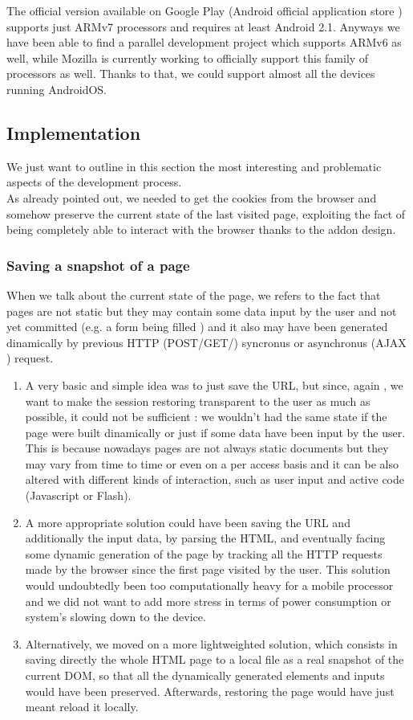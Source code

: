 \documentclass[11pt,a4paper]{article}
\begin{document}
The official version available on Google Play (Android official application store ) supports just ARMv7 processors and requires at least Android 2.1. Anyways we have been able to find a parallel development project which supports ARMv6 as well, while Mozilla is currently working to officially support this family of processors as well. Thanks to that, we could support almost all the devices running AndroidOS.

\subsection{Implementation}
We just want to outline in this section the most interesting and problematic aspects of the development process.\\
As already pointed out, we needed to get the cookies from the browser and somehow preserve the current state of the last visited page, exploiting the fact of being completely able to interact with the browser thanks to the addon design.

\subsubsection{Saving a snapshot of a page}

When we talk about the current state of the page, we refers to the fact that pages are not static but they may contain some data input by the user and not yet committed (e.g. a form being filled ) and it also may have been generated dinamically by previous HTTP (POST/GET/) syncronus or asynchronus (AJAX ) request.
\begin{enumerate}
\item A very basic and simple idea was to just save the URL,  but since, again , we want to make the session restoring transparent to the user as much as possible, it could not be sufficient : we wouldn’t had the same state if the page were built dinamically or just if some data have been input by the user. This is because nowadays pages are not always static documents but they may vary from time to time or even on a per access basis and it can be also altered with different kinds of interaction, such as user input and active code (Javascript or Flash).
\item A more appropriate solution could have been saving the URL and additionally the input data, by parsing the HTML, and eventually facing some dynamic generation of the page by tracking all the HTTP requests made by the browser since the first page visited by the user. This solution would undoubtedly been too computationally heavy for a mobile processor and we did not want to add more stress in terms of power consumption or system’s slowing down to the device.
\item Alternatively,  we moved on a more lightweighted solution, which consists in saving directly the whole HTML page to a local file as a real snapshot of the current DOM, so that all the dynamically generated elements and inputs would have been preserved. Afterwards, restoring the page would have just meant reload it locally. 
\end{enumerate}
\end{document}

